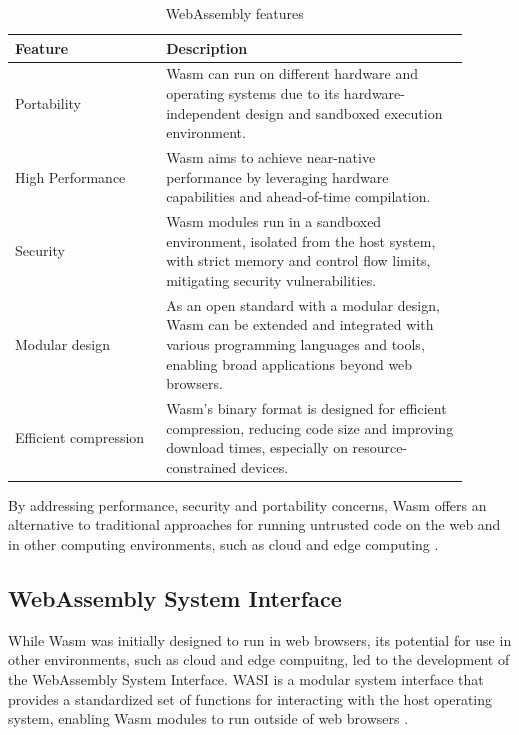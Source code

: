 \documentclass[
  table]{report}
\begin{document}
\begin{table}[ht]
\centering
\caption{WebAssembly features}
\begin{tabular}{@{}p{0.3\linewidth}@{\hskip\tabcolsep}p{0.6\linewidth}@{}}
\toprule
\textbf{Feature} & \textbf{Description} \\
\midrule

\rowcolor{green!10} Portability & Wasm can run on different hardware and
operating systems due to its hardware-independent design and sandboxed
execution environment. \\

High Performance & Wasm aims to achieve near-native performance by leveraging
hardware capabilities and ahead-of-time compilation. \\

\rowcolor{green!10} Security & Wasm modules run in a sandboxed environment,
isolated from the host system, with strict memory and control flow limits,
mitigating security vulnerabilities. \\

Modular design & As an open standard with a modular design, Wasm can be
extended and integrated with various programming languages and tools, enabling
broad applications beyond web browsers. \\

\rowcolor{green!10} Efficient compression & Wasm's binary format is designed for
efficient compression, reducing code size and improving download times,
especially on resource-constrained devices. \\

\bottomrule
\end{tabular}
\label{table:wasm_benefits}
\end{table}

By addressing performance, security and portability concerns, \ac{Wasm}
offers an alternative to traditional approaches for running untrusted
code on the web and in other computing environments, such as cloud and
edge computing \citep{haasBringingWebSpeed2017}.

\subsection{WebAssembly System Interface}

While \ac{Wasm} was initially designed to run in web browsers, its
potential for use in other environments, such as cloud and edge
compuitng, led to the development of the WebAssembly System Interface.
\ac{WASI} is a modular system interface that provides a standardized set
of functions for interacting with the host operating system, enabling
\ac{Wasm} modules to run outside of web browsers \citep{WASIDev}.
\end{document}
